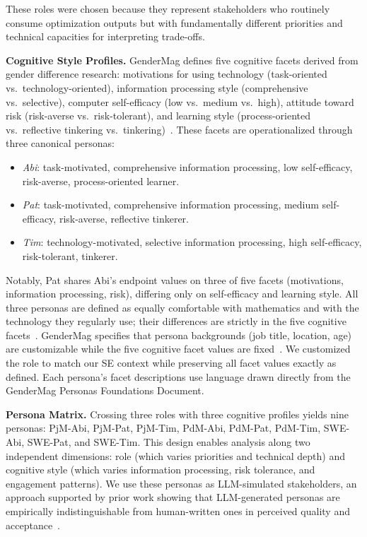 \documentclass[sigconf,review]{acmart}
\begin{document}
These roles were chosen because they represent stakeholders who 
routinely consume optimization outputs but with fundamentally 
different priorities and technical capacities for interpreting 
trade-offs.

\textbf{Cognitive Style Profiles.} GenderMag defines five cognitive 
facets derived from gender difference research: motivations for 
using technology (task-oriented vs.\ technology-oriented), 
information processing style (comprehensive vs.\ selective), 
computer self-efficacy (low vs.\ medium vs.\ high), attitude 
toward risk (risk-averse vs.\ risk-tolerant), and learning style 
(process-oriented vs.\ reflective tinkering vs.\ 
tinkering)~\cite{burnett2016gendermag, mendez2019inclusivemag}. 
These facets are operationalized through three canonical personas:

\begin{itemize}
    \item \textit{Abi}: task-motivated, comprehensive information 
    processing, low self-efficacy, risk-averse, process-oriented 
    learner.
    \item \textit{Pat}: task-motivated, comprehensive information 
    processing, medium self-efficacy, risk-averse, reflective 
    tinkerer.
    \item \textit{Tim}: technology-motivated, selective information 
    processing, high self-efficacy, risk-tolerant, tinkerer.
\end{itemize}

Notably, Pat shares Abi's endpoint values on three of five facets 
(motivations, information processing, risk), differing only on 
self-efficacy and learning style. All three personas are defined 
as equally comfortable with mathematics and with the technology 
they regularly use; their differences are strictly in the five 
cognitive facets~\cite{burnett2016gendermag}. GenderMag specifies 
that persona backgrounds (job title, location, age) are 
customizable while the five cognitive facet values are 
fixed~\cite{burnett2016gendermag}. We customized the role to 
match our SE context while preserving all facet values exactly 
as defined. Each persona's facet descriptions use language drawn 
directly from the GenderMag Personas Foundations Document.

\textbf{Persona Matrix.} Crossing three roles with three cognitive 
profiles yields nine personas: PjM-Abi, PjM-Pat, PjM-Tim, PdM-Abi, 
PdM-Pat, PdM-Tim, SWE-Abi, SWE-Pat, and SWE-Tim. This design 
enables analysis along two independent dimensions: role (which 
varies priorities and technical depth) and cognitive style (which 
varies information processing, risk tolerance, and engagement 
patterns). We use these personas as LLM-simulated stakeholders, 
an approach supported by prior work showing that LLM-generated 
personas are empirically indistinguishable from human-written ones 
in perceived quality and acceptance~\cite{schuller2024generating}.
\end{document}
